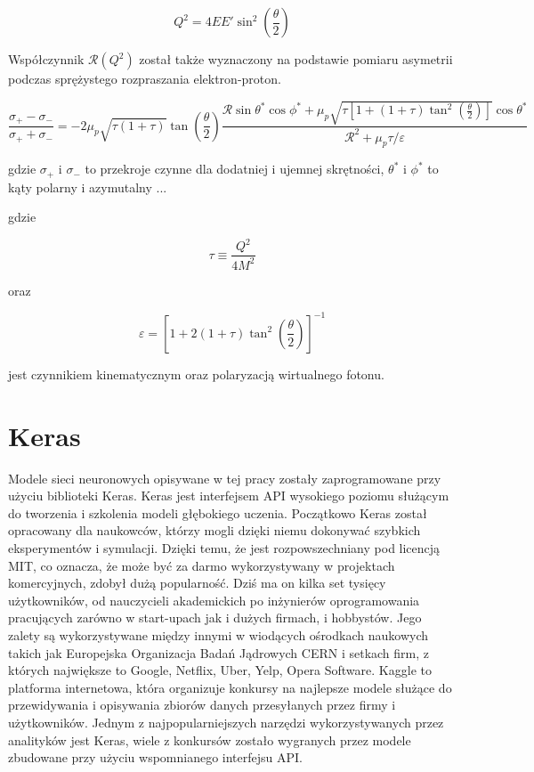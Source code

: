 \documentclass[11pt]{book}
\theoremstyle{definition}
\begin{document}
$$
Q^2 = 4 E E' \sin^2 \left(\frac{\theta}{2}\right)
$$

Współczynnik $\mathcal{R}\left(Q^2\right)$ został także wyznaczony na podstawie pomiaru asymetrii podczas sprężystego rozpraszania elektron-proton. 

$$
\frac{\sigma_+ - \sigma_-}{\sigma_+ + \sigma_-} = -2\mu_p \sqrt{\tau \left(1+\tau\right)} \tan \left(\frac{\theta}{2}\right) \frac{\mathcal{R} \sin \theta^* \cos \phi^* + \mu_p \sqrt{\tau \left[ 1 + \left(1+\tau\right) \tan^2 \left(\frac{\theta}{2}\right) \right]} \cos \theta^* }{\mathcal{R}^2 + \mu_p \tau / \varepsilon}
$$

gdzie $\sigma_+$ i $\sigma_-$ to przekroje czynne dla dodatniej i ujemnej skrętności, $\theta^*$ i $\phi^*$ to kąty polarny i azymutalny ...

gdzie

$$
\tau \equiv \frac{Q^2}{4M^2}
$$

oraz 

$$
\varepsilon = \left[ 1 + 2(1 + \tau) \tan^2 \left(\frac{\theta}{2}\right) \right]^{-1}
$$

jest czynnikiem kinematycznym oraz polaryzacją wirtualnego fotonu.


\section{Keras}
Modele sieci neuronowych opisywane w tej pracy zostały zaprogramowane przy użyciu biblioteki Keras. Keras jest interfejsem API wysokiego poziomu służącym do tworzenia i szkolenia modeli głębokiego uczenia. Początkowo Keras został opracowany dla naukowców, którzy mogli dzięki niemu dokonywać szybkich eksperymentów i symulacji. Dzięki temu, że jest rozpowszechniany pod licencją MIT, co oznacza, że może być za darmo wykorzystywany w projektach komercyjnych, zdobył dużą popularność. Dziś ma on kilka set tysięcy użytkowników, od nauczycieli akademickich po inżynierów oprogramowania pracujących zarówno w start-upach jak i dużych firmach, i hobbystów. Jego zalety są wykorzystywane między innymi w wiodących ośrodkach naukowych takich jak Europejska Organizacja Badań Jądrowych CERN i setkach firm, z których największe to Google, Netflix, Uber, Yelp, Opera Software. Kaggle to platforma internetowa, która organizuje konkursy na najlepsze modele służące do przewidywania i opisywania zbiorów danych przesyłanych przez firmy i użytkowników. Jednym z najpopularniejszych narzędzi wykorzystywanych przez analityków jest Keras, wiele z konkursów zostało wygranych przez modele zbudowane przy użyciu wspomnianego interfejsu API.
\end{document}
